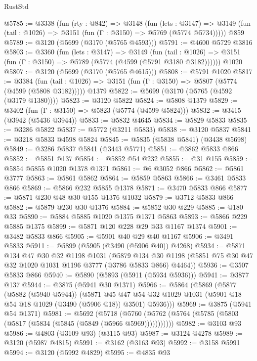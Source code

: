 \begin{lexlean}{RustStd}
\begin{coremodule}
{\begin{coremodule}
{{{{{{{{{{{{{{{{{{{{{{{{{{@5785 := @3338
    (fun (rty : @842) =>
    @3148
      (fun (lets : @3147) =>
      @3149 (fun (tail : @1026) => @3151 (fun (Γ : @3150) => @5769 (@5774 @5734)))))
    @859
@5789 := @3120 (@5699 (@3170 (@5765 @4593)))
@5791 := @4600 @5729 @3816
@5803 := @3360
    (fun (lets : @3147) =>
    @3149
      (fun (tail : @1026) => @3151 (fun (Γ : @3150) => @5789 (@5774 (@4599 (@5791 @3180 @3182))))))
    @1020
@5807 := @3120 (@5699 (@3170 (@5765 @4615)))
@5808 := @5791 @1020
@5817 := @3384
    (fun (tail : @1026) => @3151 (fun (Γ : @3150) => @5807 (@5774 (@4599 (@5808 @3182)))))
    @1379
@5822 := @5699 (@3170 (@5765 (@4592 (@3179 @1380))))
@5823 := @3120 @5822
@5824 := @5808 @1379
@5829 := @3402 (fun (Γ : @3150) => @5823 (@5774 (@4599 @5824)))
@5832 := @3415 (@3942 (@5436 @3944))
@5833 := @5832 @4645
@5834 := @5829 @5833
@5835 := @3286 @5822
@5837 := @5772 (@3211 @5833)
@5838 := @3120 @5837
@5841 := @3218 @5833 @4598 @5824
@5845 := @5835 (@5838 @5841) (@3438 @5698)
@5849 := @3286 @5837 @5841 (@3443 @5771)
@5851 := @3862 @5833 @866
@5852 := @5851 @137
@5854 := @5852 @54 @232
@5855 := @31 @155
@5859 := @5854 @5855 @1020 @1378 @1371
@5861 := @6 @3052 @866
@5862 := @5861 @3777
@5863 := @5861 @5862
@5864 := @5859 @5863
@5866 := @3461 @5833 @866
@5869 := @5866 @232 @5855 @1378
@5871 := @3470 @5833 @866
@5877 := @5871 @230 @48 @30 @155 @1376 @1032
@5879 := @3712 @5833 @866
@5882 := @5879 @230 @30 @1376
@5884 := @5852 @30 @229
@5885 := @180 @33
@5890 := @5884 @5885 @1020 @1375 @1371 @5863
@5893 := @5866 @229 @5885 @1375
@5899 := @5871 @120 @228 @29 @33 @1167 @1374
@5901 := @3482 @5833 @866
@5905 := @5901 @40 @29 @40 @1167
@5906 := @3491 @5833
@5911 := @5899 (@5905 (@3490 (@5906 @40)) @4268)
@5934 := @5871
    @134
    @47
    @30
    @32
    @1198
    @1031
    (@5879 @134 @30 @1198 (@5851 @75 @30 @47 @32 @1020 @1031 @1196 @3777 (@3786 @5833 @866) @4464))
@5936 := @3507 @5833 @866
@5940 := @5890 (@5893 (@5911 (@5934 @5936)))
@5941 := @3877 @137
@5944 := @3875 (@5941 @30 @1371)
@5966 := @5864
    (@5869
      (@5877
        (@5882 (@5940 @5944))
        (@5871
          @45
          @47
          @54
          @32
          @1029
          @1031
          (@5901 @18 @54 @18 @1029 (@3490 (@5906 @18)) @3501)
          @5936)))
@5969 := @3875 (@5941 @54 @1371)
@5981 := @5692
    (@5718 (@5760 (@5762 (@5764 (@5785 (@5803 (@5817 (@5834 (@5845 (@5849 (@5966 @5969)))))))))))
@5982 := @3103 @93
@5986 := @4803 (@3109 @93) (@3115 @93)
@5987 := @3124 @4278
@5989 := @3120 (@5987 @4815)
@5991 := @3162 (@3163 @93)
@5992 := @3158 @5991
@5994 := @3120 (@5992 @4829)
@5995 := @4835 @93
}}}}}}}}}}}}}}}}}}}}}}}}}}
\end{coremodule}}
\end{coremodule}
\end{lexlean}
